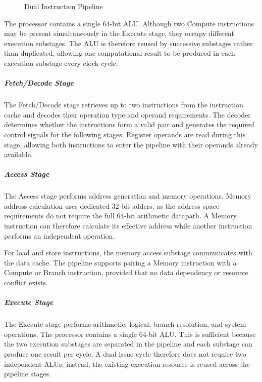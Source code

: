 \begin{figure}[H]
\begin{center}
\end{center}
\caption{Dual Instruction Pipeline}
\label{fig:Dual Instruction Pipeline}
\end{figure}

The processor contains a single 64-bit ALU. Although two Compute instructions may be present simultaneously in the Execute stage, they occupy different execution substages. The ALU is therefore reused by successive substages rather than duplicated, allowing one computational result to be produced in each execution substage every clock cycle.


\subparagraph{Fetch/Decode Stage}
The Fetch/Decode stage retrieves up to two instructions from the instruction cache and decodes their operation type and operand requirements. The decoder determines whether the instructions form a valid pair and generates the required control signals for the following stages. Register operands are read during this stage, allowing both instructions to enter the pipeline with their operands already available.

\subparagraph{Access Stage}
The Access stage performs address generation and memory operations. Memory address calculation uses dedicated 32-bit adders, as the address space requirements do not require the full 64-bit arithmetic datapath. A Memory instruction can therefore calculate its effective address while another instruction performs an independent operation.

For load and store instructions, the memory access substage communicates with the data cache. The pipeline supports pairing a Memory instruction with a Compute or Branch instruction, provided that no data dependency or resource conflict exists.

\subparagraph{Execute Stage}
The Execute stage performs arithmetic, logical, branch resolution, and system operations. The processor contains a single 64-bit ALU. This is sufficient because the two execution substages are separated in the pipeline and each substage can produce one result per cycle. A dual issue cycle therefore does not require two independent ALUs; instead, the existing execution resource is reused across the pipeline stages.

